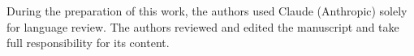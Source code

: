 During the preparation of this work, the authors used Claude (Anthropic) solely for language review. The authors reviewed and edited the manuscript and take full responsibility for its content.
